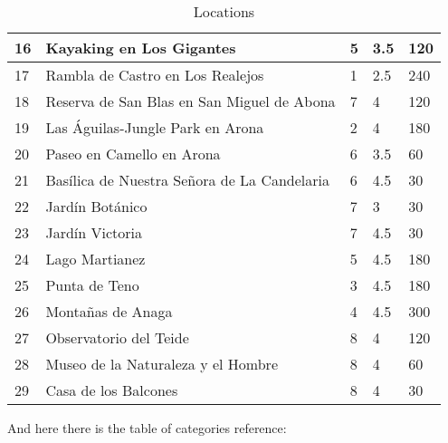 \documentclass[preprint,14pt]{elsarticle}
\begin{document}
\begin{table}[H]
\begin{tabular}{@{}|l|l|l|l|l|@{}}
16 & Kayaking en Los Gigantes                    & 5        & 3.5  & 120                \\ \midrule
17 & Rambla de Castro en Los Realejos            & 1        & 2.5  & 240                \\ \midrule
18 & Reserva de San Blas en San Miguel de Abona  & 7        & 4    & 120                \\ \midrule
19 & Las Águilas-Jungle Park en Arona            & 2        & 4    & 180                \\ \midrule
20 & Paseo en Camello en Arona                   & 6        & 3.5  & 60                 \\ \midrule
21 & Basílica de Nuestra Señora de La Candelaria & 6        & 4.5  & 30                 \\ \midrule
22 & Jardín Botánico                             & 7        & 3    & 30                 \\ \midrule
23 & Jardín Victoria                             & 7        & 4.5  & 30                 \\ \midrule
24 & Lago Martianez                              & 5        & 4.5  & 180                \\ \midrule
25 & Punta de Teno                               & 3        & 4.5  & 180                \\ \midrule
26 & Montañas de Anaga                           & 4        & 4.5  & 300                \\ \midrule
27 & Observatorio del Teide                      & 8        & 4    & 120                \\ \midrule
28 & Museo de la Naturaleza y el Hombre          & 8        & 4    & 60                 \\ \midrule
29 & Casa de los Balcones                        & 8        & 4    & 30                 \\ \bottomrule
\end{tabular}
\caption{Locations}
\label{my-label}
\end{table}


And here there is the table of categories reference: \\
\end{document}
